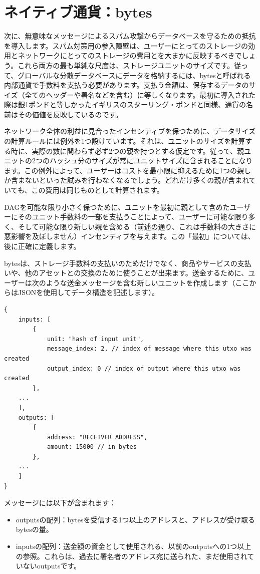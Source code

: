 \documentclass[a4paper, dvipdfmx]{jsarticle}
\begin{document}
\section{ネイティブ通貨：bytes}
次に、無意味なメッセージによるスパム攻撃からデータベースを守るための抵抗を導入します。スパム対策用の参入障壁は、ユーザーにとってのストレージの効用とネットワークにとってのストレージの費用とを大まかに反映するべきでしょう。これら両方の最も単純な尺度は、ストレージユニットのサイズです。従って、グローバルな分散データベースにデータを格納するには、bytesと呼ばれる内部通貨で手数料を支払う必要があります。支払う金額は、保存するデータのサイズ（全てのヘッダーや署名などを含む）に等しくなります。最初に導入された際は銀1ポンドと等しかったイギリスのスターリング・ポンドと同様、通貨の名前はその価値を反映しているのです。

ネットワーク全体の利益に見合ったインセンティブを保つために、データサイズの計算ルールには例外を1つ設けています。それは、ユニットのサイズを計算する時に、実際の数に関わらず必ず2つの親を持つとする仮定です。従って、親ユニットの2つのハッシュ分のサイズが常にユニットサイズに含まれることになります。この例外によって、ユーザーはコストを最小限に抑えるために1つの親しか含まないといった試みを行わなくなるでしょう。どれだけ多くの親が含まれていても、この費用は同じものとして計算されます。

DAGを可能な限り小さく保つために、ユニットを最初に親として含めたユーザーにそのユニット手数料の一部を支払うことによって、ユーザーに可能な限り多く、そして可能な限り新しい親を含める（前述の通り、これは手数料の大きさに悪影響を及ぼしません）インセンティブを与えます。この「最初」については、後に正確に定義します。

bytesは、ストレージ手数料の支払いのためだけでなく、商品やサービスの支払いや、他のアセットとの交換のために使うことが出来ます。送金するために、ユーザーは次のような送金メッセージを含む新しいユニットを作成します（ここからはJSONを使用してデータ構造を記述します）。

\begin{lstlisting}[basicstyle=\ttfamily\footnotesize, frame=none]
{
    inputs: [
        {
            unit: "hash of input unit",
            message_index: 2, // index of message where this utxo was created
            output_index: 0 // index of output where this utxo was created
        },
    ...
    ],
    outputs: [
        {
            address: "RECEIVER ADDRESS",
            amount: 15000 // in bytes
        },
    ...
    ]
}
\end{lstlisting}

\noindent メッセージには以下が含まれます：
\begin{itemize}
    \item outputsの配列：bytesを受信する1つ以上のアドレスと、アドレスが受け取るbytesの量。
    \item inputsの配列：送金額の資金として使用される、以前のoutputsへの1つ以上の参照。これらは、過去に署名者のアドレス宛に送られた、まだ使用されていないoutputsです。
\end{itemize}
\end{document}
